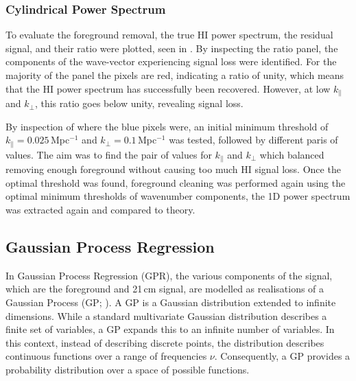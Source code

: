 
\subsubsection{Cylindrical Power Spectrum}

To evaluate the foreground removal, the true HI power spectrum, the residual signal, and their ratio were plotted, seen in . By inspecting the ratio panel, the components of the wave-vector experiencing signal loss were identified. For the majority of the panel the pixels are red, indicating a ratio of unity, which means that the HI power spectrum has successfully been recovered. However, at low $k_{\parallel}$ and $k_{\perp}$, this ratio goes below unity, revealing signal loss. 

By inspection of where the blue pixels were, an initial minimum threshold of $k_{\parallel} = 0.025$\,Mpc$^{-1}$ and $k_{\perp} = 0.1$\,Mpc$^{-1}$ was tested, followed by different paris of values. The aim was to find the pair of values for $k_{\parallel}$ and $k_{\perp}$ which balanced removing enough foreground without causing too much HI signal loss. Once the optimal threshold was found, foreground cleaning was performed again using the optimal minimum thresholds of wavenumber components, the 1D power spectrum was extracted again and compared to theory.


\subsection{Gaussian Process Regression}

In Gaussian Process Regression (GPR), the various components of the signal, which are the foreground and 21\,cm signal, are modelled as realisations of a Gaussian Process (GP; \cite{rasmussenGaussianProcessesMachine2008}). A GP is a Gaussian distribution extended to infinite dimensions. While a standard multivariate Gaussian distribution describes a finite set of variables, a GP expands this to an infinite number of variables. In this context, instead of describing discrete points, the distribution describes continuous functions over a range of frequencies $\nu$. Consequently, a GP provides a probability distribution over a space of possible functions. 


